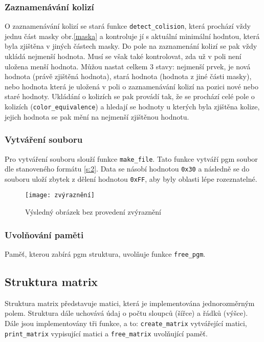 \documentclass[12pt, a4paper]{article}
\begin{document}
\subsubsection{Zaznamenávání kolizí}
O zaznamenávání kolizí se stará funkce \texttt{detect\_colision}, která prochází vždy jednu část masky obr.\ref{maska} a kontroluje jí s aktuální minimální hodntou, která byla zjištěna v jiných částech masky. Do pole na zaznamenání kolizí se pak vždy ukládá nejmenší hodnota. Musí se však také kontrolovat, zda už v poli není uložena menší hodnota. Můžou nastat celkem 3 stavy: nejmenší prvek, je nová hodnota (právě zjištěná hodnota), stará hodnota (hodnota z jiné části masky), nebo hodnota která je uložená v poli o zaznamenávání kolizí na pozici nové nebo staré hodnoty. Ukládání o kolizích se pak provádí tak, že se prochází celé pole o kolizích (\texttt{color\_equivalence}) a hledají se hodnoty u kterých byla zjištěna kolize, jejich hodnota se pak mění na nejmenší zjištěnou hodnotu.

\subsubsection{Vytváření souboru}
Pro vytváření souboru slouží funkce \texttt{make\_file}. Tato funkce vytváří pgm soubor dle stanoveného formátu \ref{s:2}. Data se násobí hodnotou \texttt{0x30} a následně se do souboru uloží zbytek z dělení hodnotou \texttt{0xFF}, aby byly oblasti lépe rozeznatelné.
\begin{figure}[h!]
\centering 
\texttt{[image: zvýraznění]} 
\caption{Výsledný obrázek bez provedení zvýraznění}
\end{figure}

\subsubsection{Uvolňování paměti}
Paměť, kterou zabírá pgm struktura, uvolňuje funkce \texttt{free\_pgm}. 

\subsection{Struktura matrix} \label{matice}
Struktura matrix představuje matici, která je implementována jednorozměrným polem. Struktura dále uchovává údaj o počtu sloupců (šířce) a řádků (výšce). Dále jsou implementovány tři funkce, a to: \texttt{create\_matrix} vytvářející matici, \texttt{print\_matrix} vypisující matici a \texttt{free\_matrix} uvolňující paměť.
\end{document}
